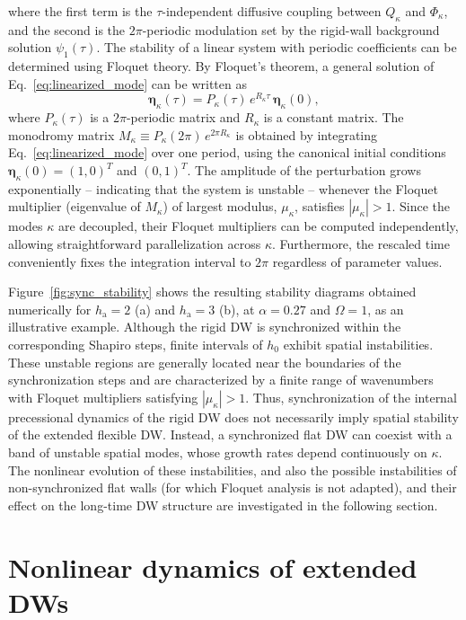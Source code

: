 \documentclass[prb,aps,twocolumn,superscriptaddress,floatfix]{revtex4-2}
\begin{document}
where the first term is the $\tau$-independent diffusive coupling between $Q_\kappa$ and $\Phi_\kappa$, and the second is the $2\pi$-periodic modulation set by the rigid-wall background solution $\psi_1(\tau)$. The stability of a linear system with periodic coefficients can be determined using Floquet theory. By Floquet's theorem, a general solution of Eq.~\eqref{eq:linearized_mode} can be written as
\begin{equation}
    \boldsymbol{\eta}_{\kappa}(\tau) = P_\kappa(\tau)\,e^{R_\kappa\tau}\,\boldsymbol{\eta}_\kappa(0),
\end{equation}
where $P_\kappa(\tau)$ is a $2\pi$-periodic matrix and $R_\kappa$ is a constant matrix. The monodromy matrix $M_\kappa \equiv P_\kappa(2\pi)\,e^{2\pi R_\kappa}$ is obtained by integrating Eq.~\eqref{eq:linearized_mode} over one period, using the canonical initial conditions $\boldsymbol{\eta}_\kappa(0) = (1,0)^T$ and $(0,1)^T$. The amplitude of the perturbation grows exponentially -- indicating that the system is unstable -- whenever the Floquet multiplier (eigenvalue of $M_\kappa$) of largest modulus, $\mu_\kappa$, satisfies $|\mu_\kappa|>1$. Since the modes $\kappa$ are decoupled, their Floquet multipliers can be computed independently, allowing straightforward parallelization across $\kappa$. Furthermore, the rescaled time conveniently fixes the integration interval to $2\pi$ regardless of parameter values.

Figure~\ref{fig:sync_stability} shows the resulting stability diagrams obtained numerically for $h_\text{a}=2$ (a) and $h_\text{a}=3$ (b), at $\alpha=0.27$ and $\Omega=1$, as an illustrative example. Although the rigid DW is synchronized within the corresponding Shapiro steps, finite intervals of $h_0$ exhibit spatial instabilities. These unstable regions are generally located near the boundaries of the synchronization steps and are characterized by a finite range of wavenumbers with Floquet multipliers satisfying $|\mu_\kappa|>1$. Thus, synchronization of the internal precessional dynamics of the rigid DW does not necessarily imply spatial stability of the extended flexible DW. Instead, a synchronized flat DW can coexist with a band of unstable spatial modes, whose growth rates depend continuously on $\kappa$. The nonlinear evolution of these instabilities, and also the possible instabilities of non-synchronized flat walls (for which Floquet analysis is not adapted), and their effect on the long-time DW structure are investigated in the following section.

\section{Nonlinear dynamics of extended DWs}
\label{sec:nonlinear_dynamics}
\end{document}
